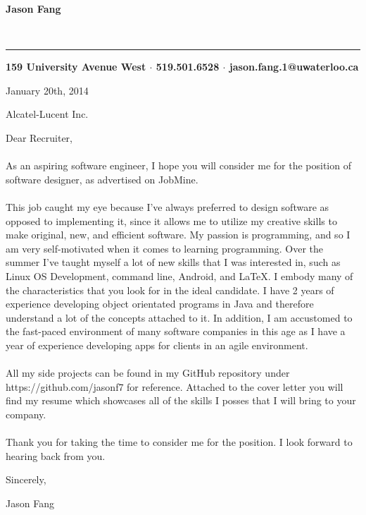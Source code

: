 \documentclass[12pt]{article}
\begin{document}
\pagestyle{empty}
\setlength{\parindent}{10cm}

\begin{center}
\begin{huge}\textbf{Jason Fang}\end{huge}\\
\rule{475pt}{1pt}
\textbf{159 University Avenue West $\cdot$ 519.501.6528 $\cdot$ jason.fang.1@uwaterloo.ca} 
\end{center}


\setlength{\parindent}{0pt}

\vspace{24pt}January 20th, 2014 

Alcatel-Lucent Inc.

Dear Recruiter,

\paragraph*{}\hspace{10pt}As an aspiring software engineer, I hope you will consider me for the position of software designer, as advertised on JobMine.

\paragraph*{}\hspace{10pt}This job caught my eye because I've always preferred to design software as opposed to implementing it, since it allows me to utilize my creative skills to make original, new, and efficient software. My passion is programming, and so I am very self-motivated when it comes to learning programming. Over the summer I've taught myself a lot of new skills that I was interested in, such as Linux OS Development, command line, Android, and \LaTeX. I embody many of the characteristics that you look for in the ideal candidate. I have 2 years of experience developing object orientated programs in Java and therefore understand a lot of the concepts attached to it. In addition, I am accustomed to the fast-paced environment of many software companies in this age as I have a year of experience developing apps for clients in an agile environment. 

\paragraph*{}\hspace{10pt}All my side projects can be found in my GitHub repository under https://github.com/jasonf7 for reference. Attached to the cover letter you will find my resume which showcases all of the skills I posses that I will bring to your company.

\paragraph*{}\hspace{10pt}Thank you for taking the time to consider me for the position. I look forward to hearing back from you.

\vspace{12pt}Sincerely,

\vspace{12pt}Jason Fang
\end{document}
